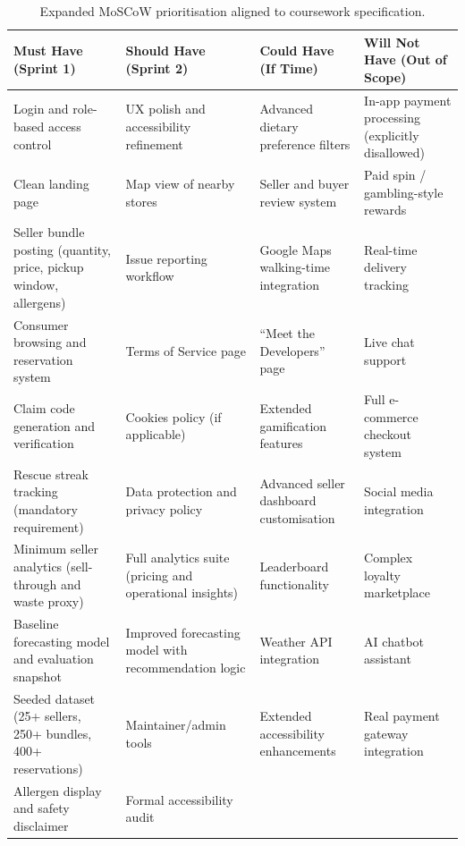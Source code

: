 \documentclass[11pt, a4paper]{report}
\begin{document}
	\begin{table}[H]
		\centering
		\begin{tabular}{|p{3.4cm}|p{3.4cm}|p{3.4cm}|p{3.4cm}|}
			\hline
			\textbf{Must Have (Sprint 1)} &
			\textbf{Should Have (Sprint 2)} &
			\textbf{Could Have (If Time)} &
			\textbf{Will Not Have (Out of Scope)} \\
			\hline
			
			Login and role-based access control &
			UX polish and accessibility refinement &
			Advanced dietary preference filters &
			In-app payment processing (explicitly disallowed) \\
			\hline
			
			Clean landing page &
			Map view of nearby stores &
			Seller and buyer review system &
			Paid spin / gambling-style rewards \\
			\hline
			
			Seller bundle posting (quantity, price, pickup window, allergens) &
			Issue reporting workflow &
			Google Maps walking-time integration &
			Real-time delivery tracking \\
			\hline
			
			Consumer browsing and reservation system &
			Terms of Service page &
			“Meet the Developers” page &
			Live chat support \\
			\hline
			
			Claim code generation and verification &
			Cookies policy (if applicable) &
			Extended gamification features &
			Full e-commerce checkout system \\
			\hline
			
			Rescue streak tracking (mandatory requirement) &
			Data protection and privacy policy &
			Advanced seller dashboard customisation &
			Social media integration \\
			\hline
			
			Minimum seller analytics (sell-through and waste proxy) &
			Full analytics suite (pricing and operational insights) &
			Leaderboard functionality &
			Complex loyalty marketplace \\
			\hline
			
			Baseline forecasting model and evaluation snapshot &
			Improved forecasting model with recommendation logic &
			Weather API integration &
			AI chatbot assistant \\
			\hline
			
			Seeded dataset (25+ sellers, 250+ bundles, 400+ reservations) &
			Maintainer/admin tools &
			Extended accessibility enhancements &
			Real payment gateway integration \\
			\hline
			
			Allergen display and safety disclaimer &
			Formal accessibility audit &
			&
			\\
			\hline
		\end{tabular}
		\caption{Expanded MoSCoW prioritisation aligned to coursework specification.}
	\end{table}
	
\end{document}

